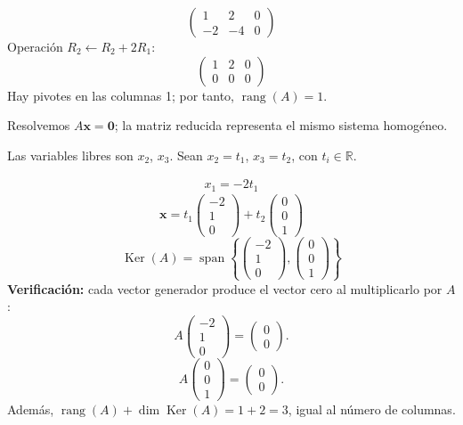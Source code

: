 \documentclass[12pt]{article}
\theoremstyle{remark}
\newcommand{\rang}{\operatorname{rang}}
\newcommand{\Ker}{\operatorname{Ker}}
\newcommand{\vect}[1]{\boldsymbol{#1}}
\begin{document}
\[
\begin{pmatrix}1&2&0\\-2&-4&0\end{pmatrix}
\]
Operación $R_{2}\leftarrow R_{2}+2R_{1}$:
\[
\begin{pmatrix}1&2&0\\0&0&0\end{pmatrix}
\]
Hay pivotes en las columnas 1; por tanto, $\boxed{\rang(A)=1}$.

Resolvemos $A\vect x=\vect0$; la matriz reducida representa el mismo sistema homogéneo.

Las variables libres son $x_{2}$, $x_{3}$. Sean $x_{2}=t_{1}$, $x_{3}=t_{2}$, con $t_i\in\mathbb R$.

\[
\begin{aligned}x_{1}=- 2 t_{1}\end{aligned}
\]
\[
\vect x=t_{1}\begin{pmatrix}-2\\1\\0\end{pmatrix} + t_{2}\begin{pmatrix}0\\0\\1\end{pmatrix}
\]
\[
\boxed{\Ker(A)=\operatorname{span}\left\{\begin{pmatrix}-2\\1\\0\end{pmatrix},\begin{pmatrix}0\\0\\1\end{pmatrix}\right\}}
\]
\textbf{Verificación:} cada vector generador produce el vector cero al multiplicarlo por $A$:
\[
A\begin{pmatrix}-2\\1\\0\end{pmatrix}=\begin{pmatrix}0\\0\end{pmatrix}.
\]
\[
A\begin{pmatrix}0\\0\\1\end{pmatrix}=\begin{pmatrix}0\\0\end{pmatrix}.
\]
Además, $\rang(A)+\dim\Ker(A)=1+2=3$, igual al número de columnas.
\end{document}
